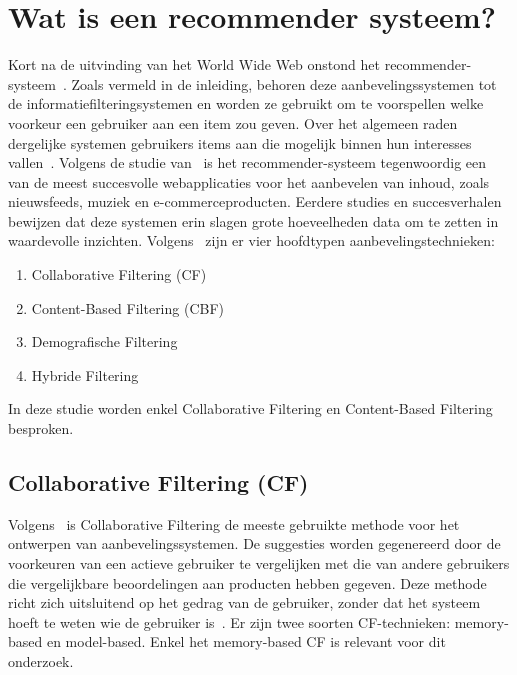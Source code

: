 \section{Wat is een recommender systeem?}
Kort na de uitvinding van het World Wide Web onstond het recommender-systeem~\autocite{Dong2022}. Zoals vermeld in de inleiding, behoren deze aanbevelingssystemen tot de informatiefilteringsystemen en worden ze gebruikt om te voorspellen welke voorkeur een gebruiker aan een item zou geven. Over het algemeen raden dergelijke systemen gebruikers items aan die mogelijk binnen hun interesses vallen~\autocite{Thorat2015}. Volgens de studie van~\textcite{Dong2022} is het recommender-systeem tegenwoordig een van de meest succesvolle webapplicaties voor het aanbevelen van inhoud, zoals nieuwsfeeds, muziek en e-commerceproducten. Eerdere studies en succesverhalen bewijzen dat deze systemen erin slagen grote hoeveelheden data om te zetten in waardevolle inzichten. Volgens~\textcite{Thorat2015} zijn er vier hoofdtypen aanbevelingstechnieken:
\begin{enumerate}
    \item Collaborative Filtering (CF)
    \item Content-Based Filtering (CBF)
    \item Demografische Filtering
    \item Hybride Filtering
\end{enumerate}
In deze studie worden enkel Collaborative Filtering en Content-Based Filtering besproken.

\subsection{Collaborative Filtering (CF)}
Volgens~\textcite{Thorat2015} is Collaborative Filtering de meeste gebruikte methode voor het ontwerpen van aanbevelingssystemen. De suggesties worden gegenereerd door de voorkeuren van een actieve gebruiker te vergelijken met die van andere gebruikers die vergelijkbare beoordelingen aan producten hebben gegeven. Deze methode richt zich uitsluitend op het gedrag van de gebruiker, zonder dat het systeem hoeft te weten wie de gebruiker is~\autocite{Koren2021}.
Er zijn twee soorten CF-technieken: memory-based en model-based. Enkel het memory-based CF is relevant voor dit onderzoek.

